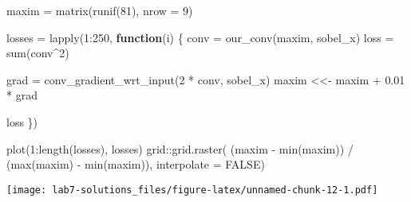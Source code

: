 \documentclass[
  a4paper,
]{article}
\newenvironment{Shaded}{\begin{snugshade}}{\end{snugshade}}
\newcommand{\AttributeTok}[1]{\textcolor[rgb]{0.77,0.63,0.00}{#1}}
\newcommand{\ConstantTok}[1]{\textcolor[rgb]{0.00,0.00,0.00}{#1}}
\newcommand{\ControlFlowTok}[1]{\textcolor[rgb]{0.13,0.29,0.53}{\textbf{#1}}}
\newcommand{\DecValTok}[1]{\textcolor[rgb]{0.00,0.00,0.81}{#1}}
\newcommand{\FloatTok}[1]{\textcolor[rgb]{0.00,0.00,0.81}{#1}}
\newcommand{\FunctionTok}[1]{\textcolor[rgb]{0.00,0.00,0.00}{#1}}
\newcommand{\NormalTok}[1]{#1}
\newcommand{\OtherTok}[1]{\textcolor[rgb]{0.56,0.35,0.01}{#1}}
\newcommand{\SpecialCharTok}[1]{\textcolor[rgb]{0.00,0.00,0.00}{#1}}
\begin{document}
\begin{Shaded}
\begin{Highlighting}[]
\NormalTok{maxim }\OtherTok{=} \FunctionTok{matrix}\NormalTok{(}\FunctionTok{runif}\NormalTok{(}\DecValTok{81}\NormalTok{), }\AttributeTok{nrow =} \DecValTok{9}\NormalTok{)}

\NormalTok{losses }\OtherTok{=} \FunctionTok{lapply}\NormalTok{(}\DecValTok{1}\SpecialCharTok{:}\DecValTok{250}\NormalTok{, }\ControlFlowTok{function}\NormalTok{(i) \{}
\NormalTok{  conv }\OtherTok{=} \FunctionTok{our\_conv}\NormalTok{(maxim, sobel\_x)}
\NormalTok{  loss }\OtherTok{=} \FunctionTok{sum}\NormalTok{(conv}\SpecialCharTok{\^{}}\DecValTok{2}\NormalTok{)}

\NormalTok{  grad }\OtherTok{=} \FunctionTok{conv\_gradient\_wrt\_input}\NormalTok{(}\DecValTok{2} \SpecialCharTok{*}\NormalTok{ conv, sobel\_x)}
\NormalTok{  maxim }\OtherTok{\textless{}\textless{}{-}}\NormalTok{ maxim }\SpecialCharTok{+} \FloatTok{0.01} \SpecialCharTok{*}\NormalTok{ grad}
  
\NormalTok{  loss}
\NormalTok{\})}

\FunctionTok{plot}\NormalTok{(}\DecValTok{1}\SpecialCharTok{:}\FunctionTok{length}\NormalTok{(losses), losses)}
\NormalTok{grid}\SpecialCharTok{::}\FunctionTok{grid.raster}\NormalTok{(}
\NormalTok{  (maxim }\SpecialCharTok{{-}} \FunctionTok{min}\NormalTok{(maxim)) }\SpecialCharTok{/}\NormalTok{ (}\FunctionTok{max}\NormalTok{(maxim) }\SpecialCharTok{{-}} \FunctionTok{min}\NormalTok{(maxim)),}
  \AttributeTok{interpolate =} \ConstantTok{FALSE}\NormalTok{)}
\end{Highlighting}
\end{Shaded}

\texttt{[image: lab7-solutions\_files/figure-latex/unnamed-chunk-12-1.pdf]}
\end{document}
